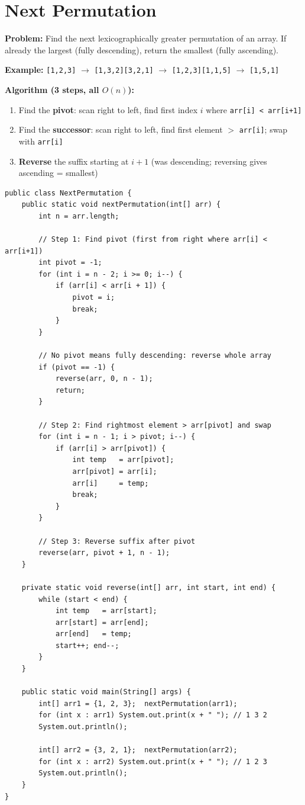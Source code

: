 \documentclass[12pt,a4paper,oneside]{book}
\begin{document}
\section{Next Permutation}

\textbf{Problem:} Find the next lexicographically greater permutation of an array. If already the largest (fully descending), return the smallest (fully ascending).

\textbf{Example:} \texttt{[1,2,3]} $\to$ \texttt{[1,3,2]}\quad \texttt{[3,2,1]} $\to$ \texttt{[1,2,3]}\quad \texttt{[1,1,5]} $\to$ \texttt{[1,5,1]}

\textbf{Algorithm (3 steps, all $O(n)$):}
\begin{enumerate}
  \item Find the \textbf{pivot}: scan right to left, find first index $i$ where \texttt{arr[i] < arr[i+1]}
  \item Find the \textbf{successor}: scan right to left, find first element $>$ \texttt{arr[i]}; swap with \texttt{arr[i]}
  \item \textbf{Reverse} the suffix starting at $i+1$ (was descending; reversing gives ascending = smallest)
\end{enumerate}

\begin{lstlisting}[caption={Next Permutation --- O(n) time O(1) space}]
public class NextPermutation {
    public static void nextPermutation(int[] arr) {
        int n = arr.length;

        // Step 1: Find pivot (first from right where arr[i] < arr[i+1])
        int pivot = -1;
        for (int i = n - 2; i >= 0; i--) {
            if (arr[i] < arr[i + 1]) {
                pivot = i;
                break;
            }
        }

        // No pivot means fully descending: reverse whole array
        if (pivot == -1) {
            reverse(arr, 0, n - 1);
            return;
        }

        // Step 2: Find rightmost element > arr[pivot] and swap
        for (int i = n - 1; i > pivot; i--) {
            if (arr[i] > arr[pivot]) {
                int temp   = arr[pivot];
                arr[pivot] = arr[i];
                arr[i]     = temp;
                break;
            }
        }

        // Step 3: Reverse suffix after pivot
        reverse(arr, pivot + 1, n - 1);
    }

    private static void reverse(int[] arr, int start, int end) {
        while (start < end) {
            int temp   = arr[start];
            arr[start] = arr[end];
            arr[end]   = temp;
            start++; end--;
        }
    }

    public static void main(String[] args) {
        int[] arr1 = {1, 2, 3};  nextPermutation(arr1);
        for (int x : arr1) System.out.print(x + " "); // 1 3 2
        System.out.println();

        int[] arr2 = {3, 2, 1};  nextPermutation(arr2);
        for (int x : arr2) System.out.print(x + " "); // 1 2 3
        System.out.println();
    }
}
\end{lstlisting}
\end{document}
